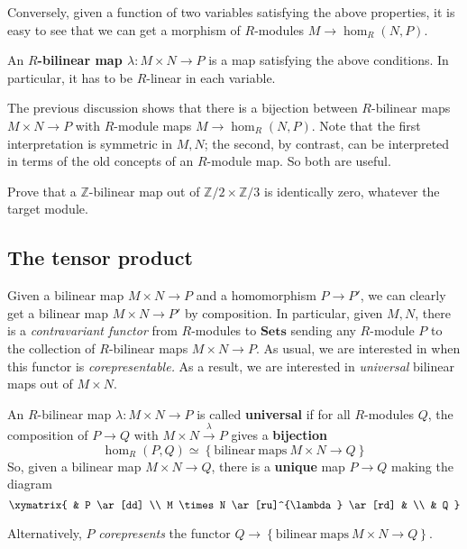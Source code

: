 Conversely, given a function of two variables satisfying the above properties,
it is easy to see that we can get a morphism of $R$-modules $M \to
\hom_R(N,P)$.



\begin{definition}
An \textbf{$R$-bilinear map $\lambda: M \times N \to P$} is a map satisfying
the above conditions. In particular, it has to be $R$-linear in each variable.
\end{definition}

The previous discussion shows that there is a bijection between $R$-bilinear
maps $M \times N \to P$ with $R$-module maps $M \to \hom_R(N,P)$.
Note that the first interpretation is symmetric in $M,N$; the second, by
contrast, can be interpreted in terms of the old concepts of an $R$-module map.
So both are useful.

\begin{exercise}
Prove that a $\mathbb{Z}$-bilinear map out of $\mathbb{Z}/2 \times
\mathbb{Z}/3$ is identically zero, whatever the target module.
\end{exercise}

\subsection{The tensor product}
Given a bilinear map $M \times N \to P$ and a homomorphism $P \to P'$, we can
clearly get a bilinear map $M \times N \to P'$ by composition.
In particular, given $M,N$, there is a \emph{contravariant functor} from
$R$-modules to
$\mathbf{Sets}$ sending  any $R$-module $P$ to the collection of $R$-bilinear
maps $M \times N
\to P$. As usual, we are interested in when this functor is
\emph{corepresentable.}
As  a result,
we are interested in \emph{universal} bilinear maps out of $M \times N$.


\begin{definition}
An $R$-bilinear map $\lambda: M \times N \to P$ is called \textbf{universal} if
for all $R$-modules $Q$, the composition of $P \to Q$ with $M \times N
\stackrel{\lambda}{\to} P$
gives a \textbf{bijection}
\[ \hom_R(P,Q) \simeq \left\{\mathrm{bilinear \ maps} \ M \times N \to
Q\right\}  \]
So, given a bilinear map $M \times N \to Q$, there is a \textbf{unique} map $P
\to Q$ making the diagram
\[
\xymatrix{
& P \ar[dd] \\
M \times N \ar[ru]^{\lambda} \ar[rd] & \\
& Q
}
\]

Alternatively, $P$ \emph{corepresents} the functor $Q \to
\left\{\mathrm{bilinear \ maps \ } M \times N \to Q\right\}$.
\end{definition}

